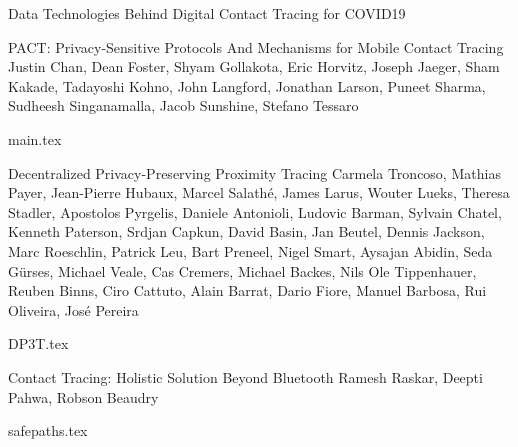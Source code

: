\documentclass[11pt]{article}
\begin{document}
\begin{bulletin}
\begin{articlesection}{Data Technologies Behind Digital Contact Tracing for COVID19}
%
%
%






\makeatletter
\renewcommand{\AB@affillist}{}
\renewcommand{\AB@authlist}{}
\setcounter{authors}{0}
\makeatother

\begin{article}
{{PACT\/}:   {P\/}rivacy-Sensitive Protocols { A\/}nd Mechanisms for Mobile {C\/}ontact { T\/}racing}
{Justin Chan, Dean Foster, Shyam Gollakota, Eric Horvitz,  Joseph Jaeger, Sham Kakade, Tadayoshi Kohno, 
John Langford, Jonathan Larson, Puneet Sharma, Sudheesh Singanamalla,
Jacob Sunshine, Stefano Tessaro}
\graphicspath{{submissions/pact/}}
{main.tex}
\end{article}


\makeatletter
\renewcommand{\AB@affillist}{}
\renewcommand{\AB@authlist}{}
\setcounter{authors}{0}
\makeatother

\begin{article}
{Decentralized Privacy-Preserving Proximity Tracing}
{Carmela Troncoso, 
Mathias Payer, 
Jean-Pierre Hubaux, 
Marcel Salath\'e, 
James Larus, 
Wouter Lueks, 
Theresa Stadler,
Apostolos Pyrgelis,
Daniele Antonioli,
Ludovic Barman,
Sylvain Chatel,
Kenneth Paterson,
Srdjan Capkun, 
David Basin,
Jan Beutel,
Dennis Jackson,
Marc Roeschlin,
Patrick Leu,
Bart Preneel,
Nigel Smart,
Aysajan Abidin,
Seda G\"urses,
Michael Veale,
Cas Cremers,
Michael Backes,
Nils Ole Tippenhauer,
Reuben Binns,
Ciro Cattuto,
Alain Barrat,
Dario Fiore,
Manuel Barbosa,
Rui Oliveira,
Jos\'e Pereira}
\graphicspath{{submissions/dp3t/}}
{DP3T.tex}
\end{article}


\makeatletter
\renewcommand{\AB@affillist}{}
\renewcommand{\AB@authlist}{}
\setcounter{authors}{0}
\makeatother


\begin{article}
{Contact Tracing: Holistic Solution Beyond Bluetooth}
{Ramesh Raskar, Deepti Pahwa, Robson Beaudry }
\graphicspath{{submissions/safepaths/}}
{safepaths.tex}
\end{article}



\end{articlesection}
\end{bulletin}
\end{document}
